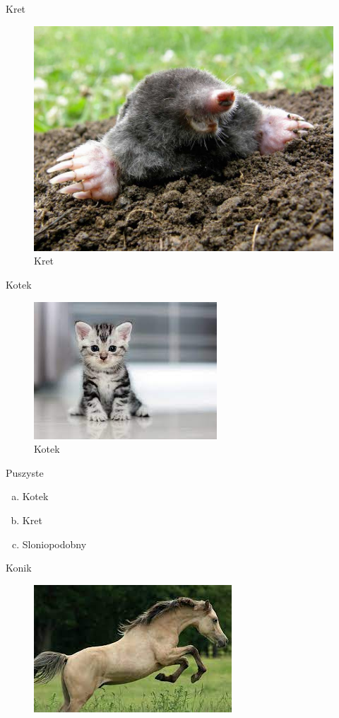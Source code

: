 \documentclass{beamer}
\begin{document}
\begin{frame}{Kret}
\begin{figure}[h!]
\includegraphics[scale=2]{kret.jpg}
\caption{Kret \cite{Wiki}}
\label{kret}
\end{figure}
\end{frame}

\begin{frame}{Kotek}
\begin{figure}[h!]
\includegraphics[scale=0.7]{kotek.jpg}
\caption{Kotek \cite{Wiki}}
\label{kotus}
\end{figure}
\end{frame}

\begin{frame}{Puszyste}
\begin{enumerate}[a)]
\item Kotek
\pause
\item Kret
\pause
\item Sloniopodobny
\end{enumerate}
\end{frame}

\begin{frame}{Konik}
\begin{figure}[h!]
\includegraphics[scale=0.3]{konik.jpg}
\end{figure}
\end{frame}
\end{document}
